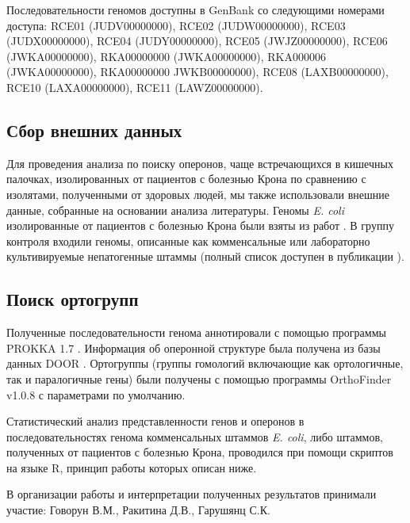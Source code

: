 Последовательности геномов доступны в GenBank со следующими номерами доступа: RCE01 (JUDV00000000), RCE02 (JUDW00000000), RCE03 (JUDX00000000), RCE04 (JUDY00000000), RCE05 (JWJZ00000000), RCE06 (JWKA00000000), RKA00000000 (JWKA00000000), RKA000006 (JWKA00000000), RKA00000000 JWKB00000000), RCE08 (LAXB00000000), RCE10 (LAXA00000000), RCE11 (LAWZ00000000).

\subsection{Сбор внешних данных}
Для проведения анализа по поиску оперонов, чаще встречающихся в кишечных палочках, изолированных от пациентов с болезнью Крона по сравнению с изолятами, полученными от здоровых людей, мы также использовали внешние данные, собранные на основании анализа литературы. Геномы \textit{E. coli} изолированные от пациентов с болезнью Крона были взяты из работ \cite{nash2010genome, miquel2010complete, krause2011complete}. В группу контроля входили геномы, описанные как комменсальные или лабораторно культивируемые непатогенные штаммы (полный список доступен в публикации \cite{rakitina2017genome}).

\subsection{Поиск ортогрупп}
Полученные последовательности генома аннотировали с помощью программы PROKKA 1.7 \cite{seemann2014prokka}. Информация об оперонной структуре была получена из базы данных DOOR \cite{mao2014door}. Ортогруппы (группы гомологий включающие как ортологичные, так и паралогичные гены) были получены с помощью программы OrthoFinder v1.0.8 \cite{emms2015orthofinder} с параметрами по умолчанию. 

Статистический анализ представленности генов и оперонов в последовательностях генома комменсальных штаммов \textit{E. coli}, либо штаммов, полученных от пациентов с болезнью Крона, проводился при помощи скриптов на языке R, принцип работы которых описан ниже.

В организации работы и интерпретации полученных результатов принимали участие: Говорун В.М., Ракитина Д.В., Гарушянц С.К.
